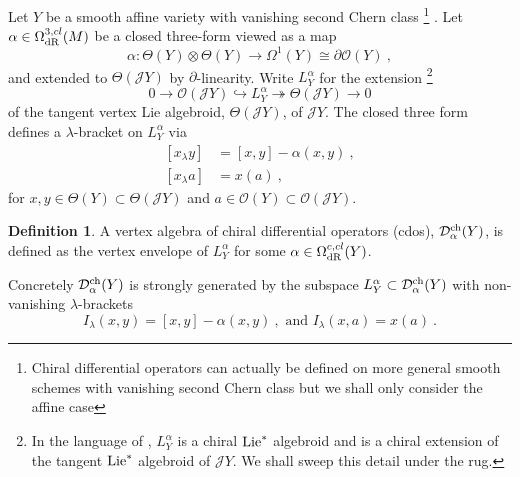\documentclass[11pt]{amsart}
\numberwithin{equation}{section}
\newtheorem{prop}[theo]{Proposition}
\theoremstyle{definition}
\newtheorem{defn}[theo]{Definition}
\newcommand{\mc}{\mathcal}
\newcommand{\D}{{\mathcal{D}}}
\newcommand{\Lie}{{\textup{Lie}}}
\newcommand{\ch}{{\textup{ch}}}
\newcommand{\0}{{\textbf{0}}}
\newcommand{\del}{{{\partial}}}
\def\JJ{{\mc J}}
\def\OO{{\mc O}}
\def\VV{{\mc V}}
\def\ch{{\rm ch}}
\def \ie{{\it i.e.}}
\begin{document}
Let $Y$ be a smooth affine variety with vanishing second Chern class%
%
\footnote{Chiral differential operators can actually be defined on more general smooth schemes with vanishing second Chern class but we shall only consider the affine case}
%
. Let $\alpha\in \Omega^{3,cl}_{\rm dR}(M)$ be a closed three-form viewed as a map
\[
\alpha:\Theta(Y)\otimes \Theta(Y)\rightarrow \Omega^1(Y)\cong \partial\OO(Y)~,
\]
and extended to $\Theta(\JJ Y)$ by $\del$-linearity. Write $L_Y^\alpha$ for the extension%
%
\footnote{In the language of \cite{BD1}, $L^\alpha_Y$ is a chiral $\Lie^*$ algebroid and is a chiral extension of the tangent $\Lie^*$ algebroid of $\JJ Y$. We shall sweep this detail under the rug.} 
%
\[
	0\rightarrow \OO(\JJ Y)\hookrightarrow L^\alpha_Y \twoheadrightarrow \Theta(\JJ Y) \rightarrow 0
\]
of the tangent vertex Lie algebroid, $\Theta(\JJ Y)$, of $\JJ Y$. The closed three form defines a $\lambda$-bracket on $L_Y^\alpha$ via
\begin{equation}
\begin{split}
 [x_\lambda y]    &= [x,y]- \alpha(x,y) ~,\\
[x_\lambda a]  &= x(a)~,
\end{split}
\end{equation}
for $x,y\in \Theta(Y)\subset \Theta(\JJ Y)$ and $a\in \OO(Y)\subset \OO(\JJ Y)$. 

\begin{defn}
	A vertex algebra of chiral differential operators (cdos), $\D^{\ch}_{\alpha}(Y)$, is defined as the vertex envelope of $L_Y^\alpha$ for some $\alpha\in \Omega^{c,cl}_{\rm dR}(Y)$.

	Concretely $\D^{\ch}_{\alpha}(Y)$ is strongly generated by the subspace $L_Y^\alpha\subset \D^{\ch}_{\alpha}(Y)$ with non-vanishing $\lambda$-brackets
	\[
	I_{\lambda}(x,y) =  [x,y] - \alpha(x,y) ~, \text{ and } I_\lambda(x,a) = x(a) ~. 
	\]
\end{defn}



\end{document}
